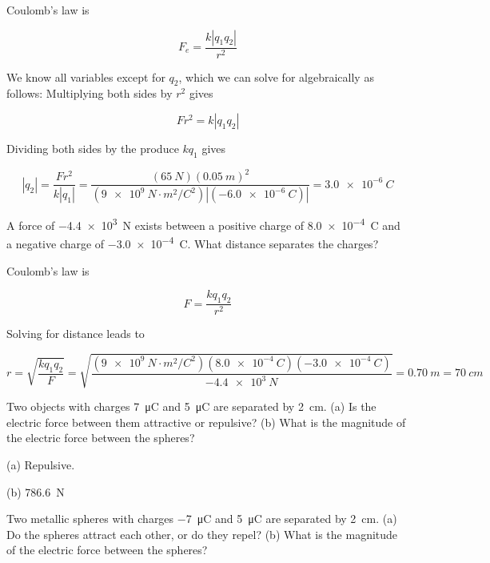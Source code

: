 \documentclass[]{exam}
\begin{document}
\begin{questions}
\begin{solution}
Coulomb's law is

\begin{equation*}
    F_e = \frac{k\left|q_1q_2\right|}{r^2}
\end{equation*}

We know all variables except for $q_2$, which we can solve for algebraically as follows: Multiplying both sides by $r^2$ gives

\begin{equation*}
    F r^2 = k |q_1 q_2|
\end{equation*}

Dividing both sides by the produce $k q_1$ gives

\begin{equation*}
    |q_2| = \frac{F r^2}{k |q_1|} = \frac{(\SI{65}{N})(\SI{0.05}{m})^2}{(\SI{9e9}{N\cdot m^2/C^2})|(-\SI{6.0e-6}{C})|} = \boxed{\SI{3.0e-6}{C}}
\end{equation*}
\end{solution}

\question 
A force of \SI{-4.4e3}{N} exists between a positive charge of \SI{8.0e-4}{C} and a negative charge of \SI{-3.0e-4}{C}. What distance separates the charges?

\begin{solution}
Coulomb's law is

\begin{equation*}
    F = \frac{k q_1 q_2}{r^2}
\end{equation*}

Solving for distance leads to

\begin{equation*}
    r = \sqrt{\frac{kq_1q_2}{F}} = \sqrt{\frac{(\SI{9e9}{N\cdot m^2/C^2})(\SI{8.0e-4}{C})(\SI{-3.0e-4}{C})}{-\SI{4.4e3}{N}}} = \boxed{\SI{0.70}{m}} = \SI{70}{cm}
\end{equation*}
\end{solution}


\question \label{z4pMlx}
Two objects with charges \SI{7}{\micro C} and \SI{5}{\micro C} are separated by \SI{2}{cm}. (a) Is the electric force between them attractive or repulsive? (b) What is the magnitude of the electric force between the spheres?

\begin{solution}
(a) Repulsive. 

(b) \SI{786.6}{N}
\end{solution}


\question \label{TPIAio}
Two metallic spheres with charges \SI{-7}{\micro C} and \SI{5}{\micro C} are separated by \SI{2}{cm}. (a) Do the spheres attract each other, or do they repel? (b) What is the magnitude of the electric force between the spheres?


\end{questions}
\end{document}
